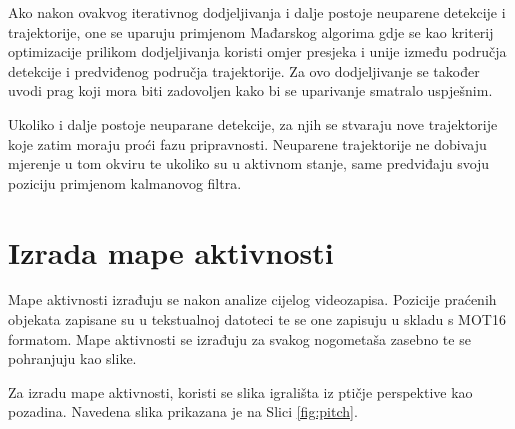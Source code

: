 \documentclass[times, utf8, seminar, numeric]{fer}
\begin{document}
Ako nakon ovakvog iterativnog dodjeljivanja i dalje postoje neuparene detekcije i trajektorije, one se uparuju primjenom Mađarskog algorima gdje se kao kriterij optimizacije prilikom dodjeljivanja koristi omjer presjeka i unije između područja detekcije i predviđenog područja trajektorije. Za ovo dodjeljivanje se također uvodi prag koji mora biti zadovoljen kako bi se uparivanje smatralo uspješnim\cite{deepsort}.

Ukoliko i dalje postoje neuparane detekcije, za njih se stvaraju nove trajektorije koje zatim moraju proći fazu pripravnosti. Neuparene trajektorije ne dobivaju mjerenje u tom okviru te ukoliko su u aktivnom stanje, same predviđaju svoju poziciju primjenom kalmanovog filtra.


\section{Izrada mape aktivnosti}

Mape aktivnosti izrađuju se nakon analize cijelog videozapisa. Pozicije praćenih objekata zapisane su u tekstualnoj datoteci te se one zapisuju u skladu s MOT16 formatom. Mape aktivnosti se izrađuju za svakog nogometaša zasebno te se pohranjuju kao slike. 

Za izradu mape aktivnosti, koristi se slika igrališta iz ptičje perspektive kao pozadina. Navedena slika prikazana je na Slici \ref{fig:pitch}. 
\end{document}
